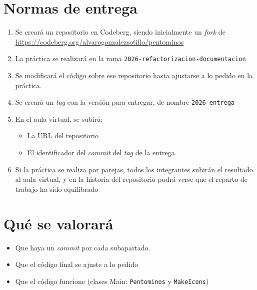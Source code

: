 \documentclass[a4paper]{article}
\begin{document}
\section{Normas de entrega}
\label{sec:org0000012}
\begin{enumerate}
\item Se creará un repositorio en Codeberg, siendo inicialmente un \emph{fork} de \url{https://codeberg.org/alvarogonzalezsotillo/pentominos}
\item La práctica se realizará en la rama \texttt{2026-refactorizacion-documentacion}
\item Se modificará el código sobre ese repositorio hasta ajustarse a lo pedido en la práctica.
\item Se creará un \emph{tag} con la versión para entregar, de nombre \texttt{2026-entrega}
\item En el aula virtual, se subirá:
\begin{itemize}
\item La URL del repositorio
\item El identificador del \emph{commit} del \emph{tag} de la entrega.
\end{itemize}
\item Si la práctica se realiza por parejas, todos los integrantes subirán el resultado al aula virtual, y en la historia del repositorio podrá verse que el reparto de trabajo ha sido equilibrado
\end{enumerate}
\section{Qué se valorará}
\label{sec:org0000015}
\begin{itemize}
\item Que haya un \emph{commit} por cada subapartado.
\item Que el código final se ajuste a lo pedido
\item Que el código funcione (clases Main: \texttt{Pentominos} y \texttt{MakeIcons})
\end{itemize}
\end{document}
